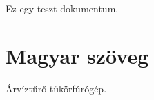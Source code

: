 \documentclass{article}
\begin{document}
Ez egy teszt dokumentum.

\section{Magyar szöveg}
Árvíztűrő tükörfúrógép.
\end{document}
